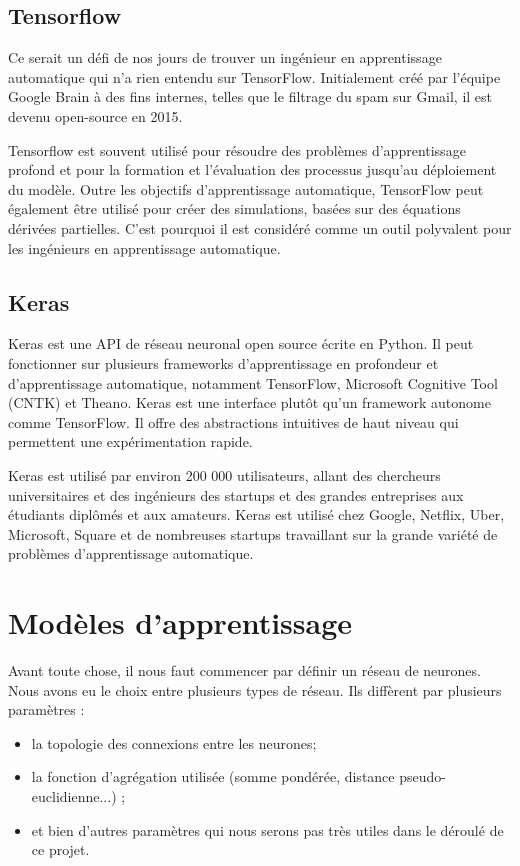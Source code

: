 \documentclass[oneside,13pt,a4paper]{report}
\begin{document}
\subsection{Tensorflow}

Ce serait un défi de nos jours de trouver un ingénieur en apprentissage automatique qui n'a rien entendu sur TensorFlow. Initialement créé par l'équipe Google Brain à des fins internes, telles que le filtrage du spam sur Gmail, il est devenu open-source en 2015.

Tensorflow est souvent utilisé pour résoudre des problèmes d'apprentissage profond et pour la formation et l'évaluation des processus jusqu'au déploiement du modèle. Outre les objectifs d'apprentissage automatique, TensorFlow peut également être utilisé pour créer des simulations, basées sur des équations dérivées partielles. C'est pourquoi il est considéré comme un outil polyvalent pour les ingénieurs en apprentissage automatique.

\subsection{Keras}

Keras est une API de réseau neuronal open source écrite en Python. Il peut fonctionner sur plusieurs frameworks d'apprentissage en profondeur et d'apprentissage automatique, notamment TensorFlow, Microsoft Cognitive Tool (CNTK) et Theano.
Keras est une interface plutôt qu'un framework autonome comme TensorFlow. Il offre des abstractions intuitives de haut niveau qui permettent une expérimentation rapide.

Keras est utilisé par environ 200 000 utilisateurs, allant des chercheurs universitaires et des ingénieurs des startups et des grandes entreprises aux étudiants diplômés et aux amateurs. Keras est utilisé chez Google, Netflix, Uber, Microsoft, Square et de nombreuses startups travaillant sur la grande variété de problèmes d'apprentissage automatique.

\section{Modèles d'apprentissage}

Avant toute chose, il nous faut commencer par définir un réseau de neurones. Nous avons eu le choix entre plusieurs types de réseau. Ils diffèrent par plusieurs paramètres :

\begin{itemize}
	\item la topologie des connexions entre les neurones;
	\item la fonction d’agrégation utilisée (somme pondérée, distance pseudo-euclidienne...) ;
	\item et bien d'autres paramètres qui nous serons pas très utiles dans le déroulé de ce projet.
\end{itemize}
\end{document}
